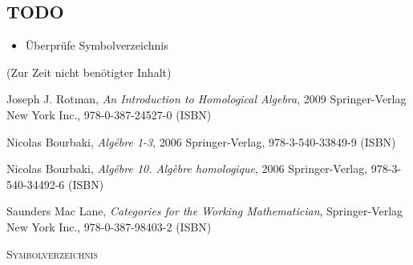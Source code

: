 \documentclass[a4paper]{amsart}
\theoremstyle{definition}
\begin{document}
\begin{backup}
\section{TODO}
\begin{itemize}
     \item Überprüfe Symbolverzeichnis
\end{itemize}


\end{backup}

\begin{backup}
    (Zur Zeit nicht benötigter Inhalt)
\end{backup}

\begin{thebibliography}{9}
   	Joseph J. Rotman, \emph{An Introduction to Homological Algebra},
   	2009 Springer-Verlag New York Inc., 978-0-387-24527-0 (ISBN)

      Nicolas Bourbaki, \emph{Algébre 1-3},
      2006 Springer-Verlag, 978-3-540-33849-9 (ISBN)

      Nicolas Bourbaki, \emph{Algébre 10. Algèbre homologique},
      2006 Springer-Verlag, 978-3-540-34492-6 (ISBN)

      Saunders Mac Lane, \emph{Categories for the Working Mathematician},
      Springer-Verlag New York Inc., 978-0-387-98403-2 (ISBN)

\end{thebibliography}

\begin{large}
    \centerline{\textsc{Symbolverzeichnis}}
\end{large}
\bigskip
\end{document}
